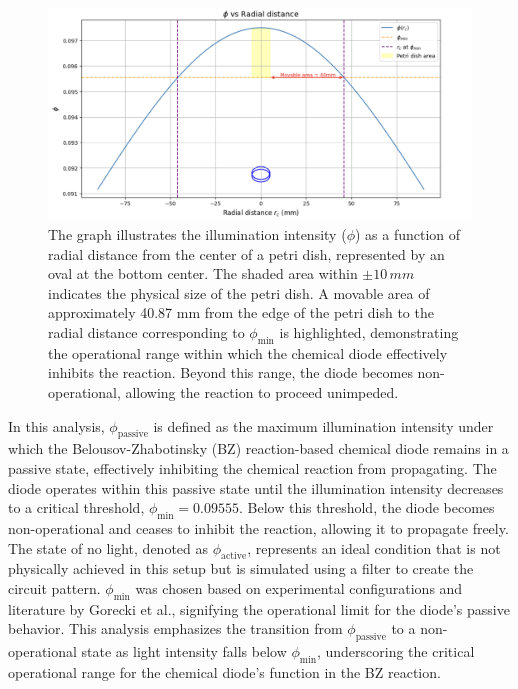 \begin{figure}[h]
    \centering
    \includegraphics[width=\textwidth]{images/Screenshot 2024-03-22 at 09.42.18.png}
    \caption{The graph illustrates the illumination intensity (\( \phi \)) as a function of radial distance from the center of a petri dish, represented by an oval at the bottom center. The shaded area within \(\pm 10\,mm\) indicates the physical size of the petri dish. A movable area of approximately 40.87 mm from the edge of the petri dish to the radial distance corresponding to \( \phi_{\min} \) is highlighted, demonstrating the operational range within which the chemical diode effectively inhibits the reaction. Beyond this range, the diode becomes non-operational, allowing the reaction to proceed unimpeded.}
    \label{fig:petri-dish-illumination}
\end{figure}

In this analysis, \( \phi_{\text{passive}} \) is defined as the maximum illumination intensity under which the Belousov-Zhabotinsky (BZ) reaction-based chemical diode remains in a passive state, effectively inhibiting the chemical reaction from propagating. The diode operates within this passive state until the illumination intensity decreases to a critical threshold, \( \phi_{\min} = 0.09555 \). Below this threshold, the diode becomes non-operational and ceases to inhibit the reaction, allowing it to propagate freely. The state of no light, denoted as \( \phi_{\text{active}} \), represents an ideal condition that is not physically achieved in this setup but is simulated using a filter to create the circuit pattern. \( \phi_{\min} \) was chosen based on experimental configurations and literature by Gorecki et al., signifying the operational limit for the diode's passive behavior. This analysis emphasizes the transition from \( \phi_{\text{passive}} \) to a non-operational state as light intensity falls below \( \phi_{\min} \), underscoring the critical operational range for the chemical diode's function in the BZ reaction.

